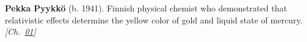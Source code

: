 \textbf{Pekka Pyykkö} (b. 1941). Finnish physical chemist who demonstrated that relativistic effects determine the yellow color of gold and liquid state of mercury. \emph{[Ch.~\hyperref[ch:goldrelativity]{01}]}

